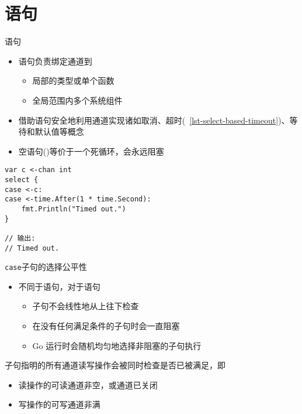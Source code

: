 \section{\select 语句}
\begin{frame}[fragile]{\select 语句}
    \begin{itemize}
        \item \select 语句负责绑定通道到
            \begin{itemize}
                \item 局部的类型或单个函数
                \item 全局范围内多个系统组件
            \end{itemize}
        \item 借助\select 语句安全地利用通道实现诸如\alert{取消}、\alert{超时}(\lstlistingname~\ref{lst-select-based-timeout})、\alert{等待}和\alert{默认值}等概念
        \item 空\select 语句()等价于一个死循环，会永远阻塞
    \end{itemize}

\begin{lstlisting}[caption={基于\select 实现超时退出},label=lst-select-based-timeout]
var c <-chan int
select {
case <-c:
case <-time.After(1 * time.Second):
    fmt.Println("Timed out.")
}

// 输出:
// Timed out.
\end{lstlisting}
    
\end{frame}

\begin{frame}{\texttt{case}子句的选择公平性}
    \begin{itemize}
        \item 不同于语句，对于\select 语句
            \begin{itemize}
                \item {}子句不会线性地从上往下检查
                \item 在没有任何满足条件的子句时会一直阻塞
                \item Go 运行时会随机均匀地选择非阻塞的子句执行
            \end{itemize}
    \end{itemize}

    \bigskip
    子句指明的所有通道读写操作会被同时检查是否已被满足，即
    \begin{itemize}
        \item 读操作的可读通道非空，或通道已关闭 
        \item 写操作的可写通道非满
    \end{itemize}
\end{frame}


